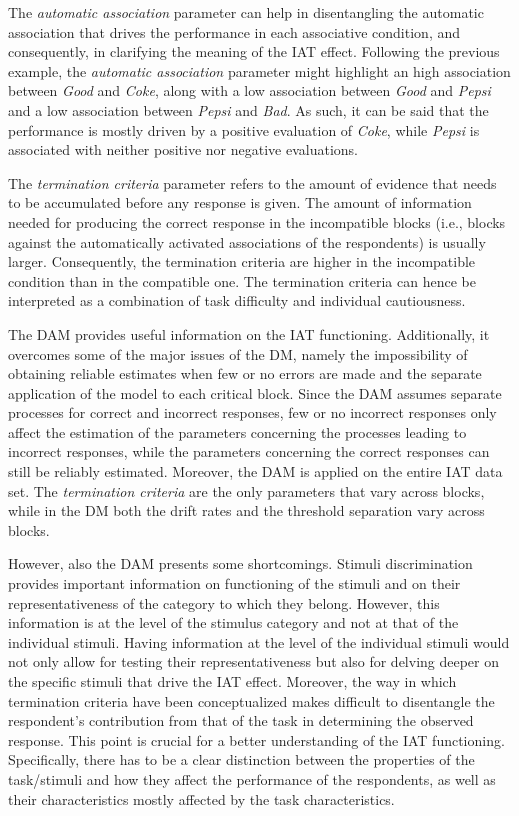 \documentclass[12pt]{book}
\begin{document}
The \emph{automatic association} parameter can help in disentangling the automatic association that drives the performance in each associative condition, and consequently, in clarifying the meaning of the IAT effect. 
Following the previous example, the \emph{automatic association} parameter might highlight an high association between \emph{Good} and \emph{Coke}, along with a low association between \emph{Good} and \emph{Pepsi} and a low association between \emph{Pepsi} and \emph{Bad}. As such, it can be said that the performance is mostly driven by a positive evaluation of \emph{Coke}, while \emph{Pepsi} is associated with neither positive nor negative evaluations.

The \emph{termination criteria} parameter refers to the amount of evidence that needs to be accumulated before any response is given. The amount of information needed for producing the correct response in the incompatible blocks (i.e., blocks against the automatically activated associations of the respondents) is usually larger. Consequently, the termination criteria are higher in the incompatible condition than in the compatible one. The termination criteria can hence be interpreted as a combination of task difficulty and individual cautiousness. 

The DAM provides useful information on the IAT functioning. Additionally, it overcomes some of the major issues of the DM, namely the impossibility of obtaining reliable estimates when few or no errors are made and the separate application of the model to each critical block. 
Since the DAM assumes separate processes for correct and incorrect responses, few or no incorrect responses only affect the estimation of the parameters concerning the processes leading to incorrect responses, while the parameters concerning the correct responses can still be reliably estimated. 
Moreover, the DAM is applied on the entire IAT data set. The \emph{termination criteria} are the only parameters that vary across blocks, while in the DM both the drift rates and the threshold separation vary across blocks. 

However, also the DAM presents some shortcomings.
Stimuli discrimination provides important information on functioning of the stimuli and on their representativeness of the category to which they belong. However, this information is at the level of the stimulus category and not at that of the individual stimuli. Having  information at the level of the individual stimuli would not only allow for testing their representativeness but also for delving deeper on the specific stimuli that drive the IAT effect. 
Moreover, the way in which termination criteria have been conceptualized makes difficult to disentangle the respondent's contribution from that of the task in determining the observed response. This point is crucial for a better understanding of the IAT functioning. Specifically, there has to be a clear distinction between the properties of the task/stimuli and how they  affect the performance of the respondents, as well as their characteristics mostly affected by the task characteristics. 
\end{document}
